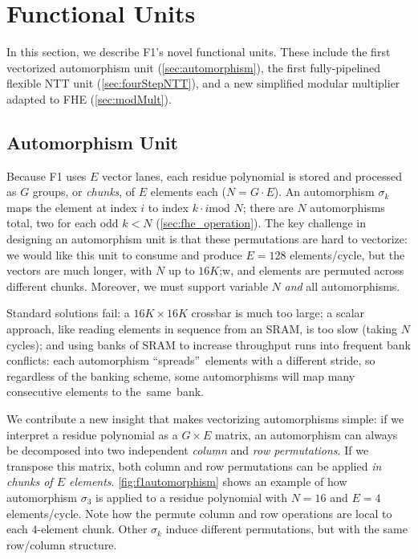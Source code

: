\section{Functional Units}
\label{sec:f1_fus}

In this section, we describe F1's novel functional units. These include the
first vectorized automorphism unit (\autoref{sec:automorphism}), the first
fully-pipelined flexible NTT unit (\autoref{sec:fourStepNTT}), and a new
simplified modular multiplier adapted to FHE (\autoref{sec:modMult}).

\subsection{Automorphism Unit}\label{sec:automorphism}

\figFOneAutomorphism

Because F1 uses $E$ vector lanes, each residue polynomial is stored and
processed as $G$ groups, or \emph{chunks}, of $E$ elements each ($N=G\cdot E$).
An automorphism $\sigma_k$ maps the element at index $i$ to index $k\cdot i \textrm{
mod } N$; there are $N$ automorphisms total, two for each odd $k < N$
(\autoref{sec:fhe_operation}). The key challenge in designing an automorphism
unit is that these permutations are hard to vectorize: we would like this unit
to consume and produce $E=128$ elements/cycle, but the vectors are much longer,
with $N$ up to $16K$;w, and elements are permuted across different chunks.
Moreover, we must support variable $N$ \emph{and} all automorphisms.

Standard solutions fail: a $16K\times16K$ crossbar is much too large; a
scalar approach, like reading elements in sequence from an SRAM, is too slow
(taking $N$ cycles); and using banks of SRAM to increase throughput runs into
frequent bank conflicts: each automorphism ``spreads''~elements with a
different stride, so regardless of the banking scheme, some automorphisms will
map many consecutive elements to the~same~bank.

We contribute a new insight that makes vectorizing automorphisms simple: if we
interpret a residue polynomial as a $G \times E$ matrix, an automorphism can
always be decomposed into two independent \emph{column} and \emph{row
permutations}. If we transpose this matrix, both column and row permutations
can be applied \emph{in chunks of $E$ elements}. \autoref{fig:f1automorphism}
shows an example of how automorphism $\sigma_3$ is applied to a residue
polynomial with $N=16$ and $E=4$ elements/cycle. Note how the permute column
and row operations are local to each $4$-element chunk. Other $\sigma_k$ induce
different permutations, but with the same row/column structure.

